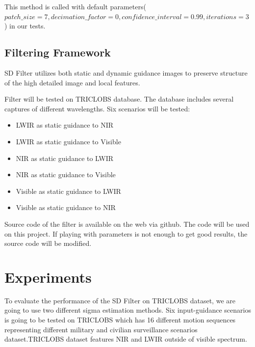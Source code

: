 \documentclass[10pt,twocolumn,letterpaper]{article}
\begin{document}
This method is called with default parameters(\(patch\_size=7, decimation\_factor=0, confidence\_interval=0.99, iterations=3\)) in our tests.
\subsection{Filtering Framework}\label{ss:filter-framework}
SD Filter\cite{ham2015robust} utilizes both static and dynamic guidance images to preserve structure of the high detailed image and local features.

Filter will be tested on TRICLOBS\cite{triclobs} database. The database includes several captures of different wavelengths. Six scenarios will be tested:
\begin{itemize}
	\item LWIR as static guidance to NIR
	\item LWIR as static guidance to Visible
	\item NIR as static guidance to LWIR
	\item NIR as static guidance to Visible
	\item Visible as static guidance to LWIR
	\item Visible as static guidance to NIR
\end{itemize}

Source code of the filter is available on the web via github\cite{github:sdfilter}. The code will be used on this project. If playing with parameters is not enough to get good results, the source code will be modified.

\section{Experiments}

To evaluate the performance of the SD Filter\cite{ham2015robust} on TRICLOBS\cite{triclobs} dataset, we are going to use two different sigma estimation methods. Six input-guidance scenarios is going to be tested on TRICLOBS which has  16 different motion sequences representing different military and civilian surveillance scenarios dataset.TRICLOBS dataset features NIR and LWIR outside of visible spectrum. 
\end{document}
